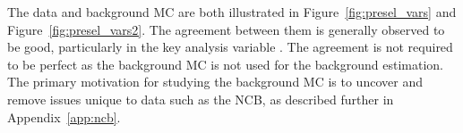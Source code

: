 The data and background MC are both illustrated in Figure~\ref{fig:presel_vars} and Figure~\ref{fig:presel_vars2}. The agreement between them is generally observed to be good, particularly in the key analysis variable \mt. The agreement is not required to be perfect as the background MC is not used for the background estimation. The primary motivation for studying the background MC is to uncover and remove issues unique to data such as the NCB, as described further in Appendix~\ref{app:ncb}.

 \clearpage
%





